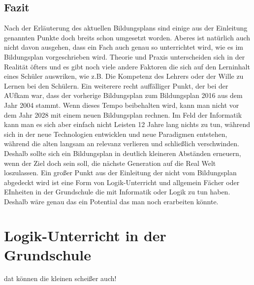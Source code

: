 \subsection{Fazit}
Nach der Erläuterung des aktuellen Bildungsplans sind einige aus der Einleitung genannten Punkte doch breits schon umgesetzt worden. Aberes ist natürlich auch nicht davon ausgehen, dass ein Fach auch genau so unterrichtet wird, wie es im Bildungsplan vorgeschrieben wird. Theorie und Praxis unterscheiden sich in der Realität öfters und es gibt noch viele andere Faktoren die sich auf den Lerninhalt eines Schüler auswriken, wie z.B. Die Kompetenz des Lehrers oder der Wille zu Lernen bei den Schülern. Ein weiterere recht auffälliger Punkt, der bei der AUfkam war, dass der vorherige Bildungsplan zum Bildungsplan 2016 aus dem Jahr 2004 stammt. Wenn dieses Tempo beibehalten wird, kann man nicht vor dem Jahr 2028 mit einem neuen Bildungsplan rechnen. Im Feld der Informatik kann man es sich aber einfach nicht Leisten 12 Jahre lang nichts zu tun, während sich in der neue Technologien entwicklen und neue Paradigmen entstehen, während die alten langsam an relevanz verlieren und schließlich verschwinden. Deshalb sollte sich ein Bildungsplan in deutlich kleineren Abständen erneuern, wenn der Ziel doch sein soll, die nächste Generation auf die Real Welt loszulassen. Ein großer Punkt aus der Einleitung der nicht vom Bildungsplan abgedeckt wird ist eine Form von Logik-Unterricht und allgemein Fächer oder EInheiten in der Grundschule die mit Informatik oder Logik zu tun haben. Deshalb wäre genau das ein Potential das man noch erarbeiten könnte.

\section{Logik-Unterricht in der Grundschule}
dat können die kleinen scheißer auch!